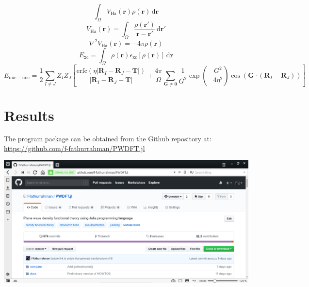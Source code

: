\documentclass[a0,landscape]{a0poster}
\begin{document}
\begin{multicols}{3}
\begin{equation}
\int_{\Omega}
V_{\mathrm{Ha}}(\mathbf{r})\rho(\mathbf{r})\,
\mathrm{d}\mathbf{r}
\end{equation}
%
\begin{equation}
V_{\mathrm{Ha}}(\mathbf{r}) =
\int_{\Omega}
\frac{\rho(\mathbf{r}')}{\mathbf{r} - \mathbf{r}'}
\,\mathrm{d}\mathbf{r}'
\end{equation}
%
\begin{equation}
\nabla^2 V_{\mathrm{Ha}}(\mathbf{r}) =
-4\pi\rho(\mathbf{r})
\end{equation}
%
\begin{equation}
E_{\mathrm{xc}} = 
\int_{\Omega}
\rho(\mathbf{r})
\epsilon_{\mathrm{xc}}\left[\rho(\mathbf{r})\right]
\,\mathrm{d}\mathbf{r}
\end{equation}
%
\begin{equation}
E_{\mathrm{nuc-nuc}} =
\frac{1}{2}
\sum_{I \neq J} Z_{I} Z_{J} \left[
\frac{\mathrm{erfc}\left( \eta
\left| \mathbf{R}_{I} - \mathbf{R}_{J} - \mathbf{T} \right|
\right)}
{\left| \mathbf{R}_{I} - \mathbf{R}_{J} - \mathbf{T} \right|}
+
\frac{4\pi}{\Omega} \sum_{\mathbf{G}\neq \mathbf{0}}
\frac{1}{G^2} \exp\left(-\dfrac{G^2}{4\eta^2}\right)
\cos\left(\mathbf{G}\cdot(\mathbf{R}_{I} - \mathbf{R}_{J})\right)
\right]
\end{equation}



\section*{Results}

The program package can be obtained from the Github repository at:
\url{https://github.com/f-fathurrahman/PWDFT.jl}

\begin{center}
\includegraphics[width=0.8\linewidth]{PWDFT_github.png}
\end{center}


\end{multicols}
\end{document}
